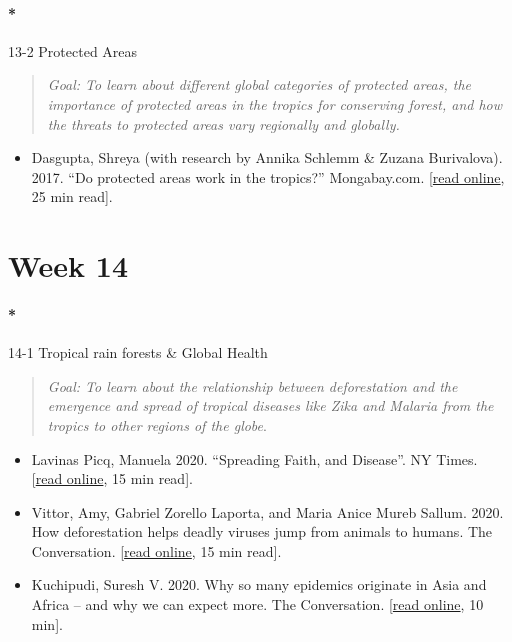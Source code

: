 \documentclass[
  10pt,
  letterpaper,
  oneside,
  open=any]{scrbook}
\let\oldparagraph\paragraph
\renewcommand{\paragraph}[1]{\oldparagraph{#1}\mbox{}}
\providecommand{\tightlist}{%
  \setlength{\itemsep}{0pt}\setlength{\parskip}{0pt}}\usepackage{longtable,booktabs,array}
\begin{document}
\paragraph*{13-2 Protected Areas}\label{protected-areas}

\begin{quote}
\emph{Goal: To learn about different global categories of protected
areas, the importance of protected areas in the tropics for conserving
forest, and how the threats to protected areas vary regionally and
globally.}
\end{quote}

\begin{itemize}
\tightlist
\item
  Dasgupta, Shreya (with research by Annika Schlemm \& Zuzana
  Burivalova). 2017. ``Do protected areas work in the tropics?''
  Mongabay.com.
  {[}\href{https://news.mongabay.com/2017/12/do-protected-areas-work-in-the-tropics/}{read
  online}, 25 min read{]}.
\end{itemize}

\section*{Week 14}\label{week-14}


\paragraph*{14-1 Tropical rain forests \& Global
Health}\label{tropical-rain-forests-global-health}

\begin{quote}
\emph{Goal: To learn about the relationship between deforestation and
the emergence and spread of tropical diseases like Zika and Malaria from
the tropics to other regions of the globe}.
\end{quote}

\begin{itemize}
\item
  Lavinas Picq, Manuela 2020. ``Spreading Faith, and Disease''. NY
  Times.
  {[}\href{https://www.nytimes.com/2020/10/02/opinion/amazon-missionaries-tribes-disease.html}{read
  online}, 15 min read{]}.
\item
  Vittor, Amy, Gabriel Zorello Laporta, and Maria Anice Mureb Sallum.
  2020. How deforestation helps deadly viruses jump from animals to
  humans. The Conversation.
  {[}\href{https://theconversation.com/how-deforestation-helps-deadly-viruses-jump-from-animals-to-humans-139645}{read
  online}, 15 min read{]}.
\item
  Kuchipudi, Suresh V. 2020. Why so many epidemics originate in Asia and
  Africa -- and why we can expect more. The Conversation.
  {[}\href{https://theconversation.com/why-so-many-epidemics-originate-in-asia-and-africa-and-why-we-can-expect-more-131657}{read
  online}, 10 min{]}.
\end{itemize}
\end{document}
